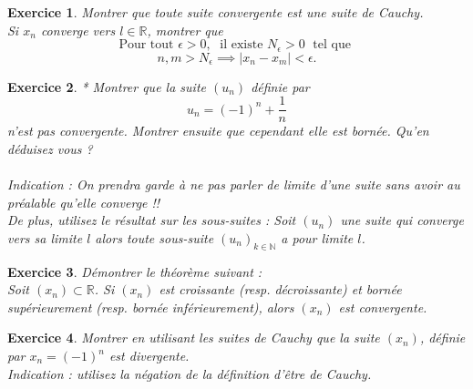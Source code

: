 \documentclass[11pt,french,table]{article}
\theoremstyle{exercice}
\newtheorem{exercice}{Exercice}
\begin{document}
\vspace{1em}
\begin{exercice}
  Montrer que toute suite convergente est une suite de Cauchy. \\
Si $x_n$ converge vers $l \in \mathbb{R}$, montrer que $$\text{Pour tout  } \epsilon > 0, \; \text{  il existe  } N_\epsilon > 0 \; \text{ tel que }$$ $$n,m > N_\epsilon \implies | x_n - x_m | < \epsilon.$$
\end{exercice}
\vspace{1em}
\begin{exercice}
   *
Montrer que la suite $(u_n)$ définie par 
\begin{equation*}
    u_n=(-1)^n+\frac{1}{n}
\end{equation*}
n'est pas convergente. Montrer ensuite que cependant elle est bornée. Qu'en déduisez vous ? \paragraph{}
\textit{Indication : On prendra garde à ne pas parler de limite d'une suite sans avoir au préalable qu'elle converge !!\\
De plus, utilisez le résultat sur les sous-suites : Soit $(u_n)$ une suite qui converge vers sa limite $l$ alors toute sous-suite $(u_n)_{k\in \mathbb{N}}$ a pour limite $l$.}
\end{exercice}
\vspace{1em}
\begin{exercice} 
\vspace{1em}
Démontrer le théorème suivant : \\
 Soit $(x_n)\subset \mathbb{R}$. Si $(x_n )$ est croissante (resp. décroissante) et bornée supérieurement (resp. bornée inférieurement), alors $(x_n)$ est convergente.
\end{exercice}
\vspace{1em}
\begin{exercice}
Montrer en utilisant les suites de Cauchy que la suite $(x_n)$, définie par $x_n=(-1)^n$ est divergente. \\ \textit{Indication :  utilisez la négation de la définition d'être de Cauchy. }
\end{exercice}
\end{document}
